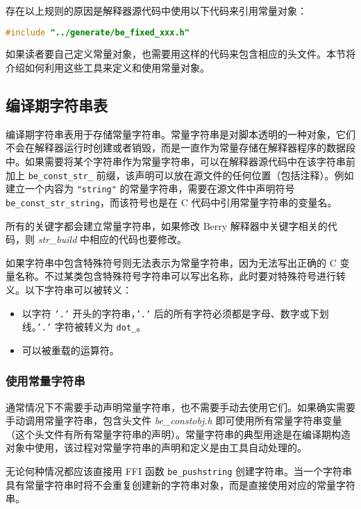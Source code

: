 存在以上规则的原因是解释器源代码中使用以下代码来引用常量对象：
\begin{lstlisting}[language=c, numbers=none]
#include "../generate/be_fixed_xxx.h"
\end{lstlisting}

如果读者要自己定义常量对象，也需要用这样的代码来包含相应的头文件。本节将介绍如何利用这些工具来定义和使用常量对象。

\subsection{编译期字符串表}

编译期字符串表用于存储常量字符串。常量字符串是对脚本透明的一种对象，它们不会在解释器运行时创建或者销毁，而是一直作为常量存储在解释器程序的数据段中。如果需要将某个字符串作为常量字符串，可以在解释器源代码中在该字符串前加上 \texttt{be\_const\_str\_} 前缀，该声明可以放在源文件的任何位置（包括注释）。例如建立一个内容为 \texttt{"string"} 的常量字符串，需要在源文件中声明符号 \texttt{be\_const\_str\_string}，而该符号也是在 C 代码中引用常量字符串的变量名。

所有的关键字都会建立常量字符串，如果修改 Berry 解释器中关键字相关的代码，则 \textsl{str\_build} 中相应的代码也要修改。

如果字符串中包含特殊符号则无法表示为常量字符串，因为无法写出正确的 C 变量名称。不过某类包含特殊符号字符串可以写出名称，此时要对特殊符号进行转义。以下字符串可以被转义：

\begin{itemize}
    \item 以字符 \texttt{'.'} 开头的字符串，\texttt{'.'} 后的所有字符必须都是字母、数字或下划线。\texttt{'.'} 字符被转义为 \texttt{dot\_}。
    \item 可以被重载的运算符。
\end{itemize}

\subsubsection{使用常量字符串}

通常情况下不需要手动声明常量字符串，也不需要手动去使用它们。如果确实需要手动调用常量字符串，包含头文件 \textsl{be\_constobj.h} 即可使用所有常量字符串变量（这个头文件有所有常量字符串的声明）。常量字符串的典型用途是在编译期构造对象中使用，该过程对常量字符串的声明和定义是由工具自动处理的。

无论何种情况都应该直接用 FFI 函数 \texttt{be\_pushstring} 创建字符串。当一个字符串具有常量字符串时将不会重复创建新的字符串对象，而是直接使用对应的常量字符串。

